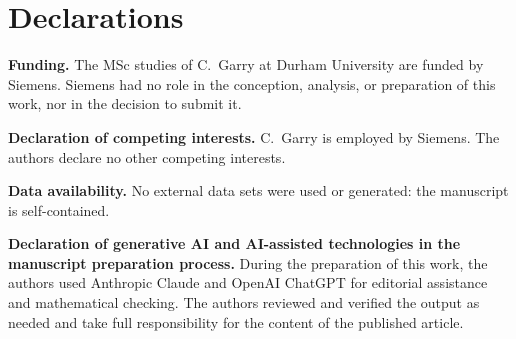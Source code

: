 \section*{Declarations}

\noindent\textbf{Funding.} The MSc studies of C.~Garry at Durham University are funded by
Siemens. Siemens had no role in the conception, analysis, or preparation of this work, nor
in the decision to submit it.

\noindent\textbf{Declaration of competing interests.} C.~Garry is employed by Siemens. The
authors declare no other competing interests.

\noindent\textbf{Data availability.} No external data sets were used or generated: the
manuscript is self-contained.

\noindent\textbf{Declaration of generative AI and AI-assisted technologies in the
manuscript preparation process.}
During the preparation of this work, the authors used Anthropic Claude and OpenAI ChatGPT
for editorial assistance and mathematical checking. The authors reviewed and verified the
output as needed and take full responsibility for the content of the published article.
